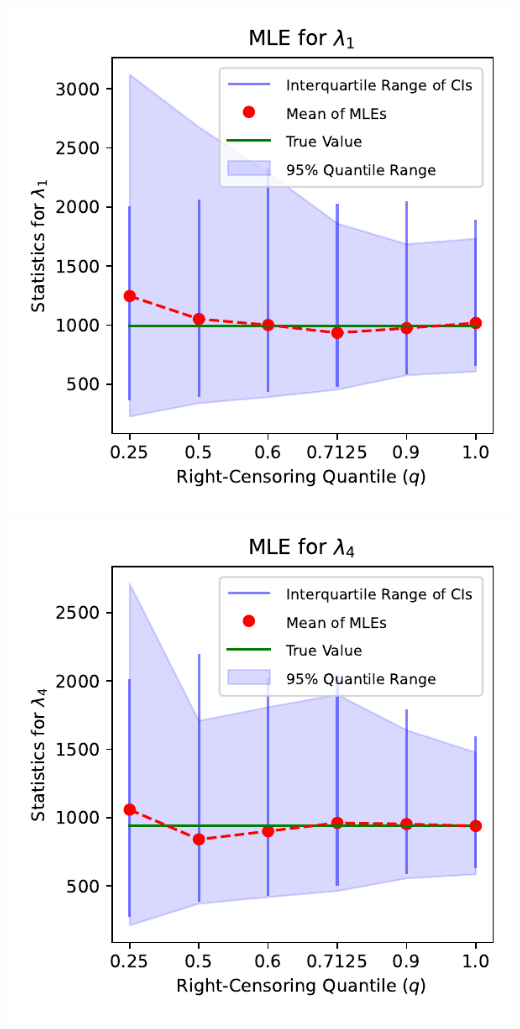 \documentclass{article}
\begin{document}
\begin{minipage}[t]{0.5\textwidth}
  \centering
  \includegraphics[width=\textwidth,height=0.33\textheight,keepaspectratio]{plot-q-vs-scale.1.pdf}\\
  \vspace{0.5mm}
  \includegraphics[width=\textwidth,height=0.33\textheight,keepaspectratio]{plot-q-vs-scale.4.pdf}\\

\end{minipage}
\end{document}
